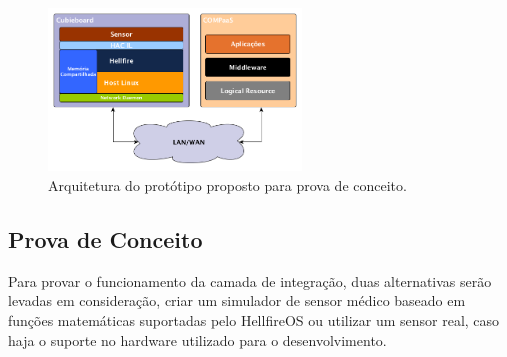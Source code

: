 \begin{figure}[H]
	\centering
		\includegraphics[width=0.6\textwidth]{fig/HAC_IL.png}
	\caption{Arquitetura do protótipo proposto para prova de conceito.}
	\label{fig:HAC_IL}
\end{figure}

\subsection{Prova de Conceito}
Para provar o funcionamento da camada de integração, duas alternativas serão levadas em consideração,
criar um simulador de sensor médico baseado em funções matemáticas suportadas pelo HellfireOS
ou utilizar um sensor real, caso haja o suporte no hardware utilizado para o desenvolvimento.
